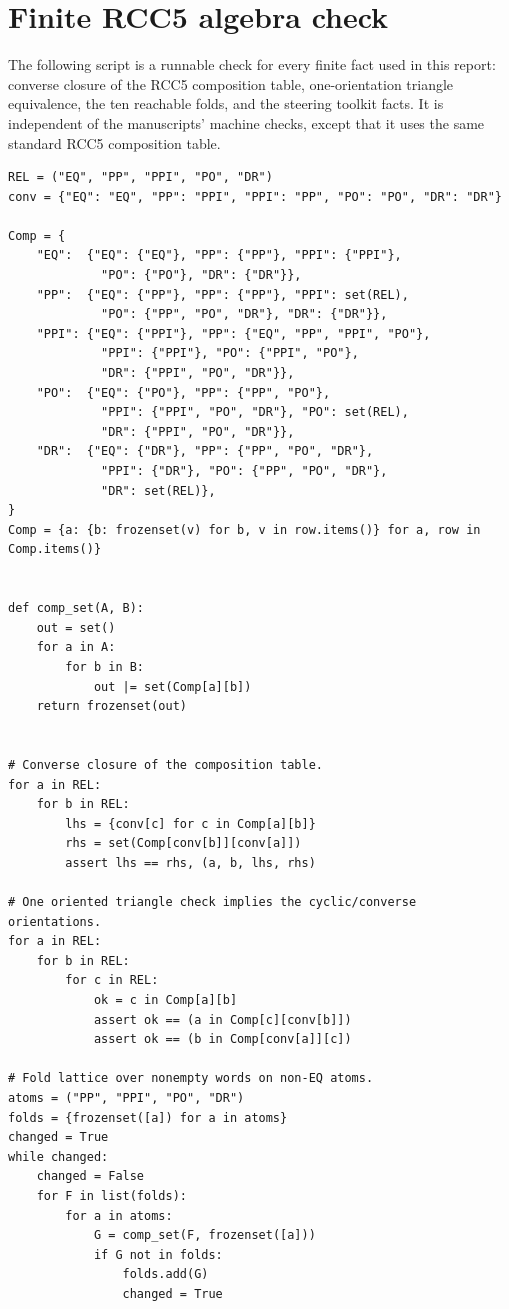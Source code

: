 \documentclass[11pt]{article}
\begin{document}
\section{Finite RCC5 algebra check}\label{app:finite-check}

The following script is a runnable check for every finite fact used in this report: converse closure of the RCC5 composition table, one-orientation triangle equivalence, the ten reachable folds, and the steering toolkit facts.  It is independent of the manuscripts' machine checks, except that it uses the same standard RCC5 composition table.

\begin{lstlisting}[style=reviewpython]
REL = ("EQ", "PP", "PPI", "PO", "DR")
conv = {"EQ": "EQ", "PP": "PPI", "PPI": "PP", "PO": "PO", "DR": "DR"}

Comp = {
    "EQ":  {"EQ": {"EQ"}, "PP": {"PP"}, "PPI": {"PPI"},
             "PO": {"PO"}, "DR": {"DR"}},
    "PP":  {"EQ": {"PP"}, "PP": {"PP"}, "PPI": set(REL),
             "PO": {"PP", "PO", "DR"}, "DR": {"DR"}},
    "PPI": {"EQ": {"PPI"}, "PP": {"EQ", "PP", "PPI", "PO"},
             "PPI": {"PPI"}, "PO": {"PPI", "PO"},
             "DR": {"PPI", "PO", "DR"}},
    "PO":  {"EQ": {"PO"}, "PP": {"PP", "PO"},
             "PPI": {"PPI", "PO", "DR"}, "PO": set(REL),
             "DR": {"PPI", "PO", "DR"}},
    "DR":  {"EQ": {"DR"}, "PP": {"PP", "PO", "DR"},
             "PPI": {"DR"}, "PO": {"PP", "PO", "DR"},
             "DR": set(REL)},
}
Comp = {a: {b: frozenset(v) for b, v in row.items()} for a, row in Comp.items()}


def comp_set(A, B):
    out = set()
    for a in A:
        for b in B:
            out |= set(Comp[a][b])
    return frozenset(out)


# Converse closure of the composition table.
for a in REL:
    for b in REL:
        lhs = {conv[c] for c in Comp[a][b]}
        rhs = set(Comp[conv[b]][conv[a]])
        assert lhs == rhs, (a, b, lhs, rhs)

# One oriented triangle check implies the cyclic/converse orientations.
for a in REL:
    for b in REL:
        for c in REL:
            ok = c in Comp[a][b]
            assert ok == (a in Comp[c][conv[b]])
            assert ok == (b in Comp[conv[a]][c])

# Fold lattice over nonempty words on non-EQ atoms.
atoms = ("PP", "PPI", "PO", "DR")
folds = {frozenset([a]) for a in atoms}
changed = True
while changed:
    changed = False
    for F in list(folds):
        for a in atoms:
            G = comp_set(F, frozenset([a]))
            if G not in folds:
                folds.add(G)
                changed = True


\end{lstlisting}
\end{document}
